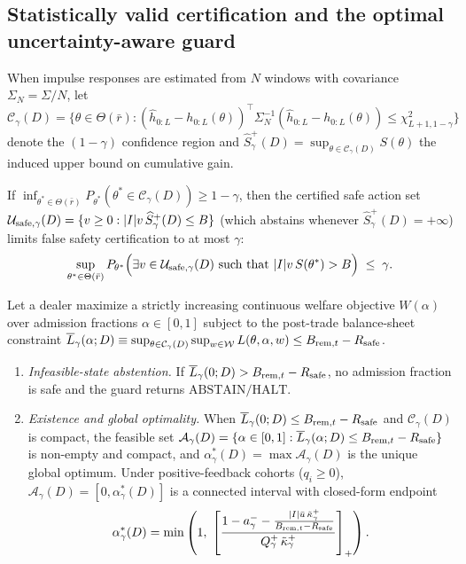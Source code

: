 \subsection{Statistically valid certification and the optimal uncertainty-aware guard}
When impulse responses are estimated from $N$ windows with covariance $\Sigma_N=\Sigma/N$, let $\mathcal C_\gamma(D)=\{\theta\in\Theta(\bar r):(\hat h_{0:L}-h_{0:L}(\theta))^\top\Sigma_N^{-1}(\hat h_{0:L}-h_{0:L}(\theta))\le\chi^2_{L+1,1-\gamma}\}$ denote the $(1-\gamma)$ confidence region and $\widehat S^+_\gamma(D)=\sup_{\theta\in\mathcal C_\gamma(D)}S(\theta)$ the induced upper bound on cumulative gain.

\begin{theorem}\label{thm:flagship_D}
If $\inf_{\theta^*\in\Theta(\bar r)}P_{\theta^*}(\theta^*\in\mathcal C_\gamma(D))\ge 1-\gamma$, then the certified safe action set $\mathcal U_{{\rm safe},\gamma}(D)=\{v\ge 0:|I|v\,\widehat S^+_\gamma(D)\le B\}$ (which abstains whenever $\widehat S^+_\gamma(D)=+\infty$) limits false safety certification to at most $\gamma$:
\[
\sup_{\theta^*\in\Theta(\bar r)}P_{\theta^*}\Bigl(\exists v\in\mathcal U_{{\rm safe},\gamma}(D)\text{ such that }|I|v\,S(\theta^*)>B\Bigr)\;\le\;\gamma.
\]
\end{theorem}

\begin{theorem}\label{thm:flagship_E}
Let a dealer maximize a strictly increasing continuous welfare objective $W(\alpha)$ over admission fractions $\alpha\in[0,1]$ subject to the post-trade balance-sheet constraint $\overline L_\gamma(\alpha;D)\equiv\sup_{\theta\in\mathcal C_\gamma(D)}\sup_{w\in\mathcal W}L(\theta,\alpha,w)\le B_{{\rm rem},t}-R_{\rm safe}$.
\begin{enumerate}[label=(\roman*)]
\item \emph{Infeasible-state abstention.} If $\overline L_\gamma(0;D)>B_{{\rm rem},t}-R_{\rm safe}$, no admission fraction is safe and the guard returns $\mathrm{ABSTAIN/HALT}$.
\item \emph{Existence and global optimality.} When $\overline L_\gamma(0;D)\le B_{{\rm rem},t}-R_{\rm safe}$ and $\mathcal C_\gamma(D)$ is compact, the feasible set $\mathcal A_\gamma(D)=\{\alpha\in[0,1]:\overline L_\gamma(\alpha;D)\le B_{{\rm rem},t}-R_{\rm safe}\}$ is non-empty and compact, and $\alpha^*_\gamma(D)=\max\mathcal A_\gamma(D)$ is the unique global optimum. Under positive-feedback cohorts ($q_i\ge 0$), $\mathcal A_\gamma(D)=[0,\alpha^*_\gamma(D)]$ is a connected interval with closed-form endpoint
\[
\alpha^*_\gamma(D)=\min\left(1,\;\left[\frac{1-a^-_\gamma-\frac{|I|\bar u\,\tilde\kappa^+_\gamma}{B_{{\rm rem},t}-R_{\rm safe}}}{Q^+_\gamma\,\tilde\kappa^+_\gamma}\right]_+\right).
\]
\end{enumerate}
\end{theorem}

